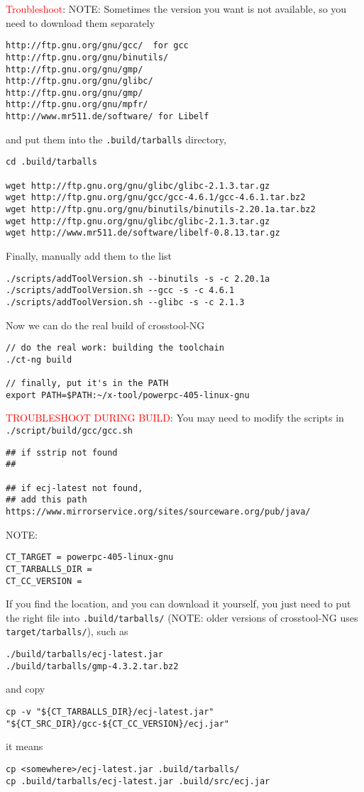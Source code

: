 \textcolor{red}{Troubleshoot}:
NOTE: Sometimes the version you want is not available, so you need to download them separately
\begin{verbatim}
http://ftp.gnu.org/gnu/gcc/  for gcc
http://ftp.gnu.org/gnu/binutils/
http://ftp.gnu.org/gnu/gmp/
http://ftp.gnu.org/gnu/glibc/
http://ftp.gnu.org/gnu/gmp/
http://ftp.gnu.org/gnu/mpfr/
http://www.mr511.de/software/ for Libelf 
\end{verbatim}
and put them into the \verb!.build/tarballs! directory,
\begin{verbatim}
cd .build/tarballs

wget http://ftp.gnu.org/gnu/glibc/glibc-2.1.3.tar.gz
wget http://ftp.gnu.org/gnu/gcc/gcc-4.6.1/gcc-4.6.1.tar.bz2
wget http://ftp.gnu.org/gnu/binutils/binutils-2.20.1a.tar.bz2
wget http://ftp.gnu.org/gnu/glibc/glibc-2.1.3.tar.gz
wget http://www.mr511.de/software/libelf-0.8.13.tar.gz
\end{verbatim}
Finally, manually add them to the list
\begin{verbatim}
./scripts/addToolVersion.sh --binutils -s -c 2.20.1a
./scripts/addToolVersion.sh --gcc -s -c 4.6.1
./scripts/addToolVersion.sh --glibc -s -c 2.1.3
\end{verbatim}



Now we can do the real build of crosstool-NG
\begin{verbatim}
// do the real work: building the toolchain
./ct-ng build

// finally, put it's in the PATH
export PATH=$PATH:~/x-tool/powerpc-405-linux-gnu
\end{verbatim}

\textcolor{red}{TROUBLESHOOT DURING BUILD}:  You may need to modify the scripts 
in \verb!./script/build/gcc/gcc.sh!
\begin{verbatim}
## if sstrip not found
## 

## if ecj-latest not found, 
## add this path
https://www.mirrorservice.org/sites/sourceware.org/pub/java/
\end{verbatim}


NOTE:
\begin{verbatim}
CT_TARGET = powerpc-405-linux-gnu
CT_TARBALLS_DIR = 
CT_CC_VERSION = 
\end{verbatim}

If you find the location, and you can download it yourself, 
you just need to put the right file into
\verb!.build/tarballs/! (NOTE: older versions of crosstool-NG uses
\verb!target/tarballs/!), such as
\begin{verbatim}
./build/tarballs/ecj-latest.jar
./build/tarballs/gmp-4.3.2.tar.bz2
\end{verbatim}
and copy
\begin{verbatim}
cp -v "${CT_TARBALLS_DIR}/ecj-latest.jar" "${CT_SRC_DIR}/gcc-${CT_CC_VERSION}/ecj.jar"
\end{verbatim}
it means
\begin{verbatim}
cp <somewhere>/ecj-latest.jar .build/tarballs/
cp .build/tarballs/ecj-latest.jar .build/src/ecj.jar
\end{verbatim}

